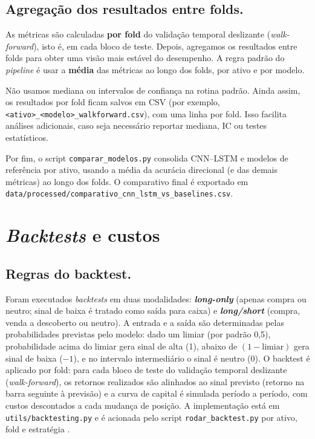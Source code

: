 \subsection{Agregação dos resultados entre folds.}
As métricas são calculadas \textbf{por fold} do validação temporal deslizante (\textit{walk-forward}),
isto é, em cada bloco de teste.
Depois, agregamos os resultados entre folds para obter uma visão mais estável do desempenho.
A regra padrão do \textit{pipeline} é usar a \textbf{média} das métricas ao longo dos folds,
por ativo e por modelo.

Não usamos mediana ou intervalos de confiança na rotina padrão.
Ainda assim, os resultados por fold ficam salvos em CSV
(por exemplo, \texttt{<ativo>\_<modelo>\_walkforward.csv}),
com uma linha por fold.
Isso facilita análises adicionais, caso seja necessário reportar mediana, IC ou testes estatísticos.

Por fim, o script \texttt{comparar\_modelos.py} consolida CNN--LSTM e modelos de referência
por ativo, usando a média da acurácia direcional (e das demais métricas) ao longo dos folds.
O comparativo final é exportado em
\texttt{data/processed/comparativo\_cnn\_lstm\_vs\_baselines.csv}.

\section{\textit{Backtests} e custos}
\label{sec:backtests-custos}

\subsection{Regras do backtest.} Foram executados \textit{backtests} em duas modalidades: \textbf{\textit{long-only}} (apenas compra ou neutro; sinal de baixa é tratado como saída para caixa) e \textbf{\textit{long/short}} (compra, venda a descoberto ou neutro). A entrada e a saída são determinadas pelas probabilidades previstas pelo modelo: dado um limiar (por padrão 0,5), probabilidade acima do limiar gera sinal de alta (1), abaixo de $(1 - \text{limiar})$ gera sinal de baixa ($-1$), e no intervalo intermediário o sinal é neutro (0). O backtest é aplicado por fold: para cada bloco de teste do validação temporal deslizante (\textit{walk-forward}), os retornos realizados são alinhados ao sinal previsto (retorno na barra seguinte à previsão) e a curva de capital é simulada período a período, com custos descontados a cada mudança de posição. A implementação está em \texttt{utils/backtesting.py} e é acionada pelo script \texttt{rodar\_backtest.py} por ativo, fold e estratégia \cite{b3_servicos}.

